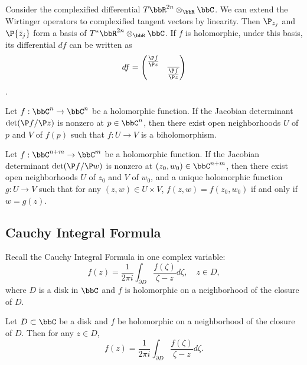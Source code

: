     Consider the complexified differential \(T\bbR^{2n} \otimes_\bbR \bbC\). 
    We can extend the Wirtinger operators to complexified tangent vectors by linearity. 
    Then \(\P_{z_j}\) and \(\P{\bar{z}_j}\) form a basis of \(T^*\bbR^{2n} \otimes_\bbR \bbC\).
    If \(f\) is holomorphic, under this basis, its differential \(df\) can be written as
    \[ df = \begin{pmatrix}
        \frac{\P f}{\P z} & \\
        & \overline{\frac{\P f}{\P z}}
    \end{pmatrix} \].

    \begin{theorem}\label{thm:holomorphic_inverse_function_theorem}
        Let \(f: \bbC^n \to \bbC^n\) be a holomorphic function. If the Jacobian determinant \(\det(\P f/\P z)\) is nonzero at \(p \in \bbC^n\), then there exist open neighborhoods \(U\) of \(p\) and \(V\) of \(f(p)\) such that \(f: U \to V\) is a biholomorphism.
    \end{theorem}

    \begin{theorem}\label{thm:holomorphic_implicit_function_theorem}
        Let \(f: \bbC^{n+m} \to \bbC^m\) be a holomorphic function. If the Jacobian determinant \(\det(\P f/\P w)\) is nonzero at \((z_0, w_0) \in \bbC^{n+m}\), then there exist open neighborhoods \(U\) of \(z_0\) and \(V\) of \(w_0\), and a unique holomorphic function \(g: U \to V\) such that for any \((z, w) \in U \times V\), \(f(z, w) = f(z_0, w_0)\) if and only if \(w = g(z)\).
    \end{theorem}

\subsection{Cauchy Integral Formula}

    Recall the Cauchy Integral Formula in one complex variable:
    \[ f(z) = \frac{1}{2\pi i} \int_{\partial D} \frac{f(\zeta)}{\zeta - z} d\zeta, \quad z \in D, \]
    where \(D\) is a disk in \(\bbC\) and \(f\) is holomorphic on a neighborhood of the closure of \(D\).

    \begin{theorem}\label{thm:Cauchy_Integral_Formula_in_one_complex_variable}
        Let \(D \subset \bbC\) be a disk and \(f\) be holomorphic on a neighborhood of the closure of \(D\). Then for any \(z \in D\),
        \[ f(z) = \frac{1}{2\pi i} \int_{\partial D} \frac{f(\zeta)}{\zeta - z} d\zeta. \]
    \end{theorem}

